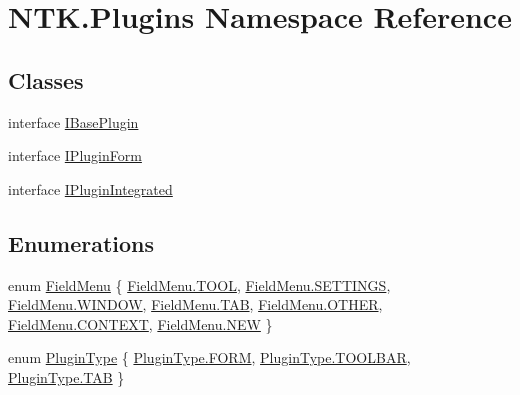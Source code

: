 \hypertarget{namespace_n_t_k_1_1_plugins}{}\section{N\+T\+K.\+Plugins Namespace Reference}
\label{namespace_n_t_k_1_1_plugins}
\subsection*{Classes}
\begin{DoxyCompactItemize}
\item 
interface \mbox{\hyperlink{interface_n_t_k_1_1_plugins_1_1_i_base_plugin}{I\+Base\+Plugin}}
\item 
interface \mbox{\hyperlink{interface_n_t_k_1_1_plugins_1_1_i_plugin_form}{I\+Plugin\+Form}}
\item 
interface \mbox{\hyperlink{interface_n_t_k_1_1_plugins_1_1_i_plugin_integrated}{I\+Plugin\+Integrated}}
\end{DoxyCompactItemize}
\subsection*{Enumerations}
\begin{DoxyCompactItemize}
\item 
enum \mbox{\hyperlink{namespace_n_t_k_1_1_plugins_af944b76d225e171a8ed7d3ca5e30667e}{Field\+Menu}} \{ \newline
\mbox{\hyperlink{namespace_n_t_k_1_1_plugins_af944b76d225e171a8ed7d3ca5e30667ea6d968f544234ee91647113b2f6eec82e}{Field\+Menu.\+T\+O\+OL}}, 
\mbox{\hyperlink{namespace_n_t_k_1_1_plugins_af944b76d225e171a8ed7d3ca5e30667eaed6f7aca7887a927b9ed3d62aa347a86}{Field\+Menu.\+S\+E\+T\+T\+I\+N\+GS}}, 
\mbox{\hyperlink{namespace_n_t_k_1_1_plugins_af944b76d225e171a8ed7d3ca5e30667ea70e2a9fa5d5ec49dc67453eab551251d}{Field\+Menu.\+W\+I\+N\+D\+OW}}, 
\mbox{\hyperlink{namespace_n_t_k_1_1_plugins_af944b76d225e171a8ed7d3ca5e30667eaf684bf05fa3e81528c84d1d281d839f1}{Field\+Menu.\+T\+AB}}, 
\newline
\mbox{\hyperlink{namespace_n_t_k_1_1_plugins_af944b76d225e171a8ed7d3ca5e30667ea03570470bad94692ce93e32700d2e1cb}{Field\+Menu.\+O\+T\+H\+ER}}, 
\mbox{\hyperlink{namespace_n_t_k_1_1_plugins_af944b76d225e171a8ed7d3ca5e30667ea03dcdeb793b893c48eda7952aac3c03c}{Field\+Menu.\+C\+O\+N\+T\+E\+XT}}, 
\mbox{\hyperlink{namespace_n_t_k_1_1_plugins_af944b76d225e171a8ed7d3ca5e30667ea24d459a81449d7210c8f9a86c2913034}{Field\+Menu.\+N\+EW}}
 \}
\item 
enum \mbox{\hyperlink{namespace_n_t_k_1_1_plugins_a28446e981e24d29d7c9c23b245f6987b}{Plugin\+Type}} \{ \mbox{\hyperlink{namespace_n_t_k_1_1_plugins_a28446e981e24d29d7c9c23b245f6987ba03c37111e264eee423ada395dd6474aa}{Plugin\+Type.\+F\+O\+RM}}, 
\mbox{\hyperlink{namespace_n_t_k_1_1_plugins_a28446e981e24d29d7c9c23b245f6987bacf4b2ed50ec6bdf4d8e85e76e22f89fb}{Plugin\+Type.\+T\+O\+O\+L\+B\+AR}}, 
\mbox{\hyperlink{namespace_n_t_k_1_1_plugins_a28446e981e24d29d7c9c23b245f6987baf684bf05fa3e81528c84d1d281d839f1}{Plugin\+Type.\+T\+AB}}
 \}
\end{DoxyCompactItemize}


